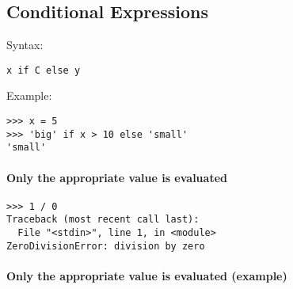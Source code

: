 \documentclass[12pt]{article}
\begin{document}

\subsection{Conditional Expressions}





\lstset{style=mystyle}


Syntax:

\begin{lstlisting}
x if C else y
\end{lstlisting}

Example:

\begin{lstlisting}
>>> x = 5
>>> 'big' if x > 10 else 'small'
'small'
\end{lstlisting}

\paragraph{Only the appropriate value is evaluated}

\begin{lstlisting}
>>> 1 / 0
Traceback (most recent call last):
  File "<stdin>", line 1, in <module>
ZeroDivisionError: division by zero
\end{lstlisting}

\paragraph{Only the appropriate value is evaluated (example)}
\end{document}
